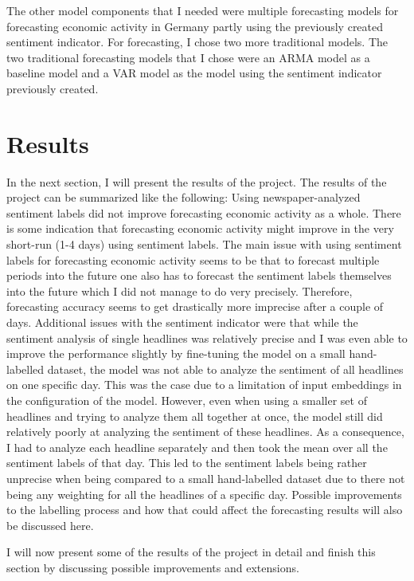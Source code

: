 \documentclass[11pt, a4paper, leqno]{article}
\begin{document}
The other model components that I needed were multiple forecasting models for forecasting economic activity in Germany partly using the previously created sentiment indicator. For forecasting, I chose two more traditional models. The two traditional forecasting models that I chose were an ARMA model as a baseline model and a VAR model as the model using the sentiment indicator previously created.

\section{Results}

In the next section, I will present the results of the project. The results of the project can be summarized like the following: Using newspaper-analyzed sentiment labels did not improve forecasting economic activity as a whole. There is some indication that forecasting economic activity might improve in the very short-run (1-4 days) using sentiment labels. The main issue with using sentiment labels for forecasting economic activity seems to be that to forecast multiple periods into the future one also has to forecast the sentiment labels themselves into the future which I did not manage to do very precisely. Therefore, forecasting accuracy seems to get drastically more imprecise after a couple of days. Additional issues with the sentiment indicator were that while the sentiment analysis of single headlines was relatively precise and I was even able to improve the performance slightly by fine-tuning the model on a small hand-labelled dataset, the model was not able to analyze the sentiment of all headlines on one specific day. This was the case due to a limitation of input embeddings in the configuration of the model. However, even when using a smaller set of headlines and trying to analyze them all together at once, the model still did relatively poorly at analyzing the sentiment of these headlines. As a consequence, I had to analyze each headline separately and then took the mean over all the sentiment labels of that day. This led to the sentiment labels being rather unprecise when being compared to a small hand-labelled dataset due to there not being any weighting for all the headlines of a specific day. Possible improvements to the labelling process and how that could affect the forecasting results will also be discussed here.

I will now present some of the results of the project in detail and finish this section by discussing possible improvements and extensions.
\end{document}
